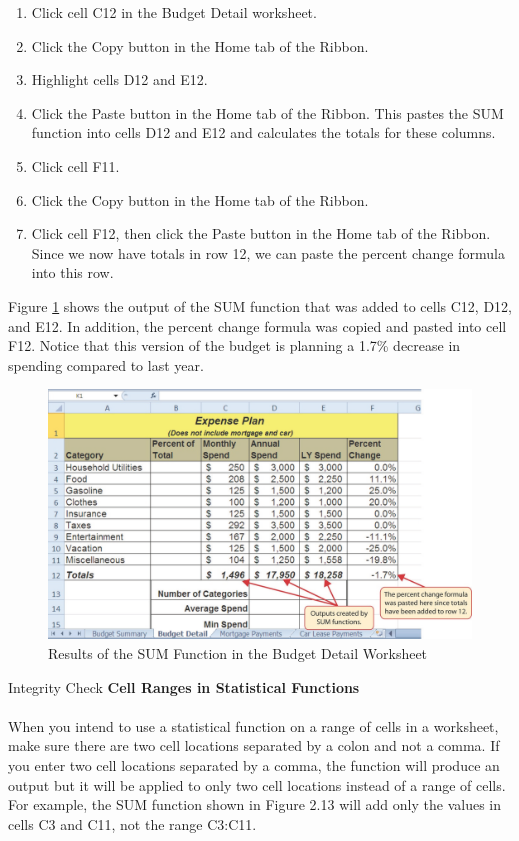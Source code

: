 \begin{enumerate}
	\item Click cell \textsf{C12} in the Budget Detail worksheet.
	\item Click the Copy button in the Home tab of the Ribbon.
	\item Highlight cells \textsf{D12} and \textsf{E12}.
	\item Click the Paste button in the Home tab of the Ribbon. This pastes the SUM function into cells \textsf{D12} and \textsf{E12} and calculates the totals for these columns.
	\item Click cell \textsf{F11}.
	\item Click the Copy button in the Home tab of the Ribbon.
	\item Click cell \textsf{F12}, then click the Paste button in the Home tab of the Ribbon. Since we now have totals in row 12, we can paste the percent change formula into this row.
\end{enumerate}

Figure \ref{02:fig12} shows the output of the SUM function that was added to cells \textsf{C12}, \textsf{D12}, and \textsf{E12}. In addition, the percent change formula was copied and pasted into cell \textsf{F12}. Notice that this version of the budget is planning a 1.7\% decrease in spending compared to last year.

\begin{figure}[H]
	\centering
	\includegraphics[width=\maxwidth{.95\linewidth}]{gfx/ch02_fig12}
	\caption{Results of the SUM Function in the Budget Detail Worksheet}
	\label{02:fig12}
\end{figure}

\begin{center}
	\begin{infobox}{Integrity Check}
		\textbf{Cell Ranges in Statistical Functions}
		\\
		\\
		When you intend to use a statistical function on a range of cells in a worksheet, make sure there are two cell locations separated by a colon and not a comma. If you enter two cell locations separated by a comma, the function will produce an output but it will be applied to only two cell locations instead of a range of cells. For example, the SUM function shown in Figure 2.13 will add only the values in cells \textsf{C3} and \textsf{C11}, not the range \textsf{C3:C11}.
	\end{infobox}
\end{center}

